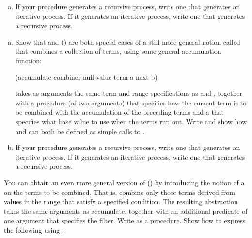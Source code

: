 \begin{exerciseGroup}
\begin{enumerate}[a.]
$$ \frac{\pi}{4}
=
\frac{2\cdot 4\cdot 4\cdot 6\cdot 6\cdot 8\cdots}%
{3\cdot 3\cdot 5\cdot 5\cdot 7\cdot 7\cdots}\,. $$

\item
If your  procedure generates a recursive process, write one that
generates an iterative process.  If it generates an iterative process, write
one that generates a recursive process.

\end{enumerate}

\label{Exercise 1.32}
 \begin{enumerate}[a.]

\item
Show that  and  () are both special
cases of a still more general notion called  that combines a
collection of terms, using some general accumulation function:

\begin{codeBlock}
(accumulate combiner null-value term a next b)
\end{codeBlock}

 takes as arguments the same term and range specifications as
 and , together with a  procedure (of
two arguments) that specifies how the current term is to be combined with the
accumulation of the preceding terms and a  that specifies what
base value to use when the terms run out.  Write  and show how
 and  can both be defined as simple calls to
.

\item
If your  procedure generates a recursive process, write one
that generates an iterative process.  If it generates an iterative process,
write one that generates a recursive process.

\end{enumerate}

\label{Exercise 1.33}
 You can obtain an even more
general version of  () by introducing the
notion of a  on the terms to be combined.  That is, combine
only those terms derived from values in the range that satisfy a specified
condition.  The resulting  abstraction takes the same
arguments as accumulate, together with an additional predicate of one argument
that specifies the filter.  Write  as a procedure.
Show how to express the following using :


\end{exerciseGroup}
